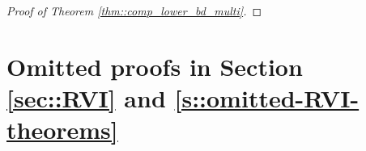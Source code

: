 \documentclass{article} %
\newcommand{\cA}{\mathcal{A}}
\newcommand{\cS}{\mathcal{S}}
\newcommand{\cP}{\mathcal{P}}
\newcommand*{\para}[1]{\left({#1}\right)}
\newcommand*{\infn}[1]{\left\|{#1}\right\|_{\infty}}
\begin{document}
\begin{proof}[Proof of Theorem \ref{thm::comp_lower_bd_multi}]
\end{proof}


\vspace{0.1in}


\section{Omitted proofs in Section \ref{sec::RVI} and \ref{s::omitted-RVI-theorems}}\label{s::omitted-RVI-proofs}
\end{document}

